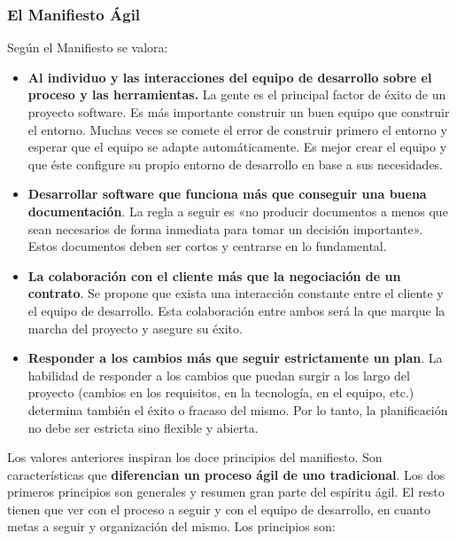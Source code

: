     \subsubsection{El Manifiesto Ágil} %
    \label{ssub:el_manifiesto_agil}
    
      Según el Manifiesto se valora:
      
      \begin{itemize}
        \item {\bf Al individuo y las interacciones del equipo de desarrollo sobre el proceso y las herramientas.} La gente es el principal factor de éxito de un proyecto software. Es más importante construir un buen equipo que construir el entorno. Muchas veces se comete el error de construir primero el entorno y esperar que el equipo se adapte automáticamente. Es mejor crear el equipo y que éste configure su propio entorno de desarrollo en base a sus necesidades.
        \item {\bf Desarrollar software que funciona más que conseguir una buena documentación}. La regla a seguir es «no producir documentos a menos que sean necesarios de forma inmediata para tomar un decisión importante». Estos documentos deben ser cortos y centrarse en lo fundamental.
        \item {\bf La colaboración con el cliente más que la negociación de un contrato}. Se propone que exista una interacción constante entre el cliente y el equipo de desarrollo. Esta colaboración entre ambos será la que marque la marcha del proyecto y asegure su éxito.
        \item {\bf Responder a los cambios más que seguir estrictamente un plan}. La habilidad de responder a los cambios que puedan surgir a los largo del proyecto (cambios en los requisitos, en la tecnología, en el equipo, etc.) determina también el éxito o fracaso del mismo. Por lo tanto, la planificación no debe ser estricta sino flexible y abierta.
      \end{itemize}
      
      Los valores anteriores inspiran los doce principios del manifiesto. Son características que {\bf diferencian un proceso ágil de uno tradicional}. Los dos primeros principios son generales y resumen gran parte del espíritu ágil. El resto tienen que ver con el proceso a seguir y con el equipo de desarrollo, en cuanto metas a seguir y organización del mismo. Los principios son:
      
